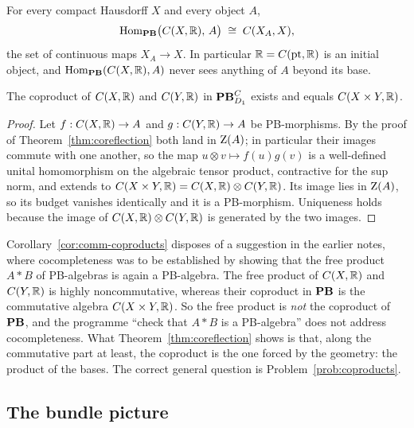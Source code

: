 \begin{corollary}\label{cor:points}
For every compact Hausdorff $X$ and every object $A$,
\[
  \operatorname{Hom}_{\mathbf{PB}}\bigl(C(X,\mathbb{R}),\,A\bigr)\;\cong\;C(X_A,X),
\]
the set of continuous maps $X_A\to X$.  In particular $\mathbb{R}=C(\mathrm{pt},\mathbb{R})$
is an initial object, and $\operatorname{Hom}_{\mathbf{PB}}(C(X,\mathbb{R}),A)$ never sees anything of $A$
beyond its base.
\end{corollary}

\begin{corollary}\label{cor:comm-coproducts}
The coproduct of $C(X,\mathbb{R})$ and $C(Y,\mathbb{R})$ in $\mathbf{PB}^C_{D_1}$ exists and
equals $C(X\times Y,\mathbb{R})$.
\end{corollary}

\begin{proof}
Let $f:C(X,\mathbb{R})\to A$ and $g:C(Y,\mathbb{R})\to A$ be PB-morphisms.  By the proof of
Theorem~\ref{thm:coreflection} both land in $\operatorname{Z}(A)$; in particular their
images commute with one another, so the map $u\otimes v\mapsto f(u)g(v)$ is a
well-defined unital homomorphism on the algebraic tensor product, contractive
for the sup norm, and extends to $C(X\times Y,\mathbb{R})=C(X,\mathbb{R})\otimes C(Y,\mathbb{R})$.
Its image lies in $\operatorname{Z}(A)$, so its budget vanishes identically and it is a
PB-morphism.  Uniqueness holds because the image of $C(X,\mathbb{R})\otimes C(Y,\mathbb{R})$
is generated by the two images.
\end{proof}

\begin{warning}
\label{warn:not-free-product}
Corollary~\ref{cor:comm-coproducts} disposes of a suggestion in the earlier
notes, where cocompleteness was to be established by showing that the free
product $A*B$ of PB-algebras is again a PB-algebra.  The free product of
$C(X,\mathbb{R})$ and $C(Y,\mathbb{R})$ is highly noncommutative, whereas their coproduct in
$\mathbf{PB}$ is the commutative algebra $C(X\times Y,\mathbb{R})$.  So the free product is
\emph{not} the coproduct of $\mathbf{PB}$, and the programme ``check that $A*B$ is a
PB-algebra'' does not address cocompleteness.  What Theorem~\ref{thm:coreflection}
shows is that, along the commutative part at least, the coproduct is the one
forced by the geometry: the product of the bases.  The correct general question
is Problem~\ref{prob:coproducts}.
\end{warning}

\subsection{The bundle picture}
\label{sec:bundle}

